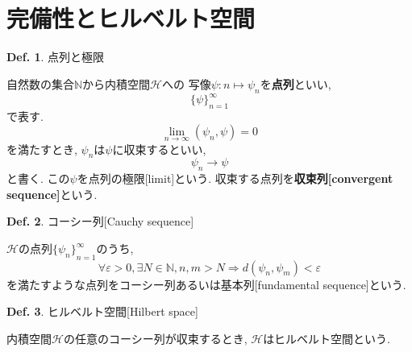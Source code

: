 \documentclass[a4paper,10pt,report]{amsart}
\theoremstyle{plain}
\theoremstyle{definition}
\newtheorem{defn}{Def.}[section]
\theoremstyle{remark}
\begin{document}
\section{完備性とヒルベルト空間}
\begin{leftbar}
    \begin{defn}点列と極限\par
        自然数の集合\(\mathbb{N}\)から内積空間\(\mathcal{H}\)への
        写像\(\psi:n\mapsto\psi_{n}\)を\textbf{点列}といい,
        \begin{equation}
            {\{\psi{}\}}_{n=1}^{\infty}
        \end{equation}
        で表す. 
        \begin{equation}
            \lim_{n\to\infty}(\psi_{n},\psi)=0
        \end{equation}
        を満たすとき, \(\psi_{n}\)は\(\psi{}\)に収束するといい, 
        \begin{equation}
            \psi_{n}\rightarrow\psi
        \end{equation}
        と書く. この\(\psi{}\)を点列の極限[limit]という. 
        収束する点列を\textbf{収束列[convergent sequence]}という. 
    \end{defn}
\end{leftbar}
\begin{leftbar}
    \begin{defn}コーシー列[Cauchy sequence]\par
        \(\mathcal{H}\)の点列\({\{\psi_{n}\}}_{n=1}^{\infty}\)のうち, 
        \begin{equation}
            \forall\varepsilon>0,\exists N\in\mathbb{N},n,m>N\Rightarrow d(\psi_{n},\psi_{m})<\varepsilon
        \end{equation}
        を満たすような点列をコーシー列あるいは基本列[fundamental sequence]という. 
    \end{defn}
\end{leftbar}
\begin{leftbar}
    \begin{defn}ヒルベルト空間[Hilbert space]\par
        内積空間\(\mathcal{H}\)の任意のコーシー列が収束するとき, 
        \(\mathcal{H}\)はヒルベルト空間という.
    \end{defn}
\end{leftbar}
\end{document}
